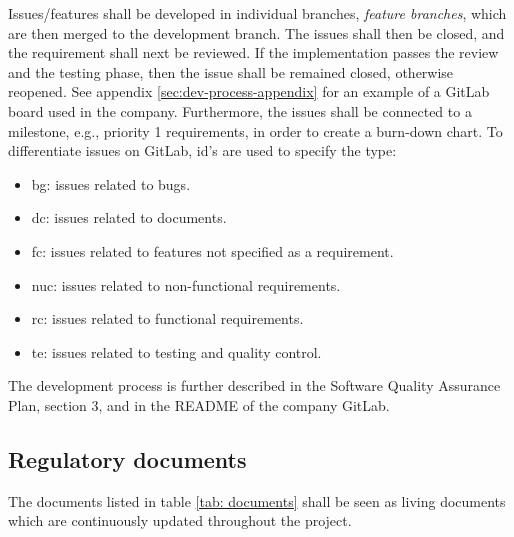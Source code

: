 Issues/features shall be developed in individual branches, \emph{feature branches}, which are then merged to the development branch. The issues shall then be closed, and the requirement shall next be reviewed. If the implementation passes the review and the testing phase, then the issue shall be remained closed, otherwise reopened. See appendix \ref{sec:dev-process-appendix} for an example of a GitLab board used in the company. Furthermore, the issues shall be connected to a milestone, e.g., priority 1 requirements, in order to create a burn-down chart. To differentiate issues on GitLab, id's are used to specify the type:
\begin{itemize}
    \item bg: issues related to bugs.
    \item dc: issues related to documents.
    \item fc: issues related to features not specified as a requirement.
    \item nuc: issues related to non-functional requirements. 
    \item rc: issues related to functional requirements.
    \item te: issues related to testing and quality control. 
\end{itemize}
The development process is further described in the Software Quality Assurance Plan, section 3, and in the README of the company GitLab. 

\subsection{Regulatory documents}
\label{sec:companywide:subsection:documents}
The documents listed in table \ref{tab: documents} shall be seen as living documents which are continuously updated throughout the project.

